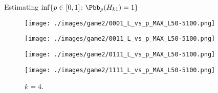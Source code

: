 \documentclass[11pt, mathserif]{beamer}
\begin{document}
    \begin{frame}
        \textcolor{blendedblue}{Estimating $\inf\{p \in [0, 1] \colon \Pbb_p(H_{k1}) = 1\}$}
        \begin{figure}[!hbt]
          \centering
          \begin{minipage}{.35\linewidth}
            \centering
              \texttt{[image: ./images/game2/0001\_L\_vs\_p\_MAX\_L50-5100.png]}
            \caption{$k = 1$.}
            \label{}
          \end{minipage}
          \begin{minipage}{.35\linewidth}
            \centering
              \texttt{[image: ./images/game2/0011\_L\_vs\_p\_MAX\_L50-5100.png]}
            \caption{$k = 2$.}
            \label{}
          \end{minipage}      
          \begin{minipage}{.35\linewidth}
            \centering
              \texttt{[image: ./images/game2/0111\_L\_vs\_p\_MAX\_L50-5100.png]}
            \caption{$k = 3$.}
            \label{}
          \end{minipage}      
          \begin{minipage}{.35\linewidth}
            \centering
              \texttt{[image: ./images/game2/1111\_L\_vs\_p\_MAX\_L50-5100.png]}
            \caption{$k = 4$.}
            \label{}{}
          \end{minipage}                     
        \end{figure} 
    \end{frame}
\end{document}
